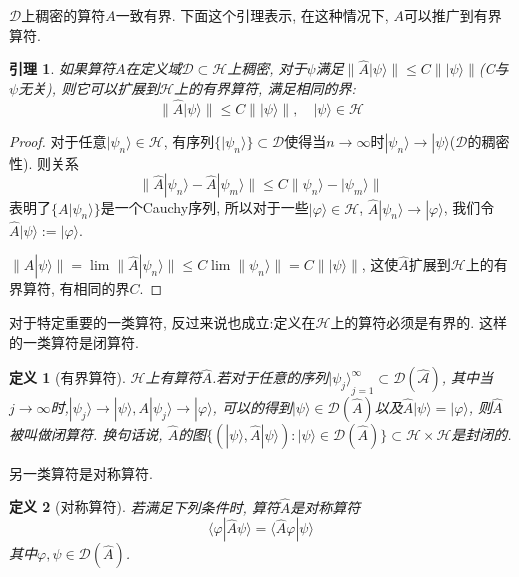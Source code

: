 \documentclass[a4paper,11pt]{book}
\newtheorem{definition}{\hspace{2em}定义}[section]
\newtheorem{lemma}{\hspace{2em}引理}[section]
\newtheorem{proof}{证明}[section]
\begin{document}
$\mathcal{D}$上稠密的算符$A$一致有界. 下面这个引理表示, 在这种情况下, $A$可以推广到有界算符.
\begin{lemma}
  如果算符$A$在定义域$\mathcal{D}\subset\mathcal{H}$上稠密, 对于$\psi$满足$\|\hat{A}|\psi\rangle\|\leq C\||\psi\rangle\|$(C与$\psi$无关), 则它可以扩展到$\mathcal{H}$上的有界算符, 满足相同的界:
\begin{equation*}
  \|\hat{A}|\psi\rangle\|\leq C\||\psi\rangle\|,\quad|\psi\rangle\in\mathcal{H}
\end{equation*}
\end{lemma}
\begin{proof}
  对于任意$|\psi_n\rangle\in\mathcal{H}$, 有序列$\{|\psi_n\rangle\}\subset \mathcal{D}$使得当$n\to\infty$时$|\psi_n\rangle\to|\psi\rangle$($\mathcal{D}$的稠密性). 则关系
\begin{equation*}
  \|\hat{A}|\psi_n\rangle-\hat{A}|\psi_m\rangle\|\leq C\|\psi_n\rangle-|\psi_m\rangle\|
\end{equation*}
表明了$\{A|\psi_n\rangle\}$是一个Cauchy序列, 所以对于一些$|\varphi\rangle\in\mathcal{H}$, $\hat{A}|\psi_n\rangle\to|\varphi\rangle$, 我们令$\hat{A}|\psi\rangle:=|\varphi\rangle$.

$\|\hat{A}|\psi\rangle\|=\lim\|\hat{A}|\psi_n\rangle\|\leq C\lim\|\psi_n\rangle\|=C\||\psi\rangle\|$, 这使$\hat{A}$扩展到$\mathcal{H}$上的有界算符, 有相同的界$C$.
\end{proof}
对于特定重要的一类算符, 反过来说也成立:定义在$\mathcal{H}$上的算符必须是有界的. 这样的一类算符是闭算符.
\begin{definition}[有界算符]\label{Closed operator def}
  $\mathcal{H}$上有算符$\hat{A}$.若对于任意的序列${|\psi_j\rangle}_{j=1}^{\infty}\subset\mathcal{D(\hat{A})}$, 其中当$j\to\infty$时,$|\psi_j\rangle\to|\psi\rangle, A|\psi_j\rangle\to|\varphi\rangle$, 可以的得到$|\psi\rangle\in\mathcal{D}(\hat{A})$以及$\hat{A}|\psi\rangle=|\varphi\rangle$, 则$\hat{A}$被叫做闭算符. 换句话说, $\hat{A}$的图$\{(|\psi\rangle,\hat{A}|\psi\rangle):|\psi\rangle\in\mathcal{D}(\hat{A})\}\subset\mathcal{H}\times\mathcal{H}$是封闭的.
\end{definition}
另一类算符是对称算符.
\begin{definition}[对称算符]\label{Symmetric operator}
  若满足下列条件时, 算符$\hat{A}$是对称算符
\begin{equation*}
  \langle\varphi|\hat{A}\psi\rangle=\langle\hat{A}\varphi|\psi\rangle
\end{equation*}
其中$\varphi,\psi\in\mathcal{D}(\hat{A})$.
\end{definition}
\end{document}
